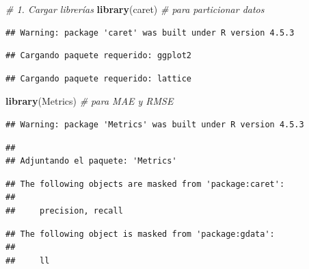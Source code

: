 \documentclass[
]{article}
\newenvironment{Shaded}{\begin{snugshade}}{\end{snugshade}}
\newcommand{\CommentTok}[1]{\textcolor[rgb]{0.56,0.35,0.01}{\textit{#1}}}
\newcommand{\FunctionTok}[1]{\textcolor[rgb]{0.13,0.29,0.53}{\textbf{#1}}}
\newcommand{\NormalTok}[1]{#1}
\begin{document}
\begin{Shaded}
\begin{Highlighting}[]
\CommentTok{\# 1. Cargar librerías}
\FunctionTok{library}\NormalTok{(caret)     }\CommentTok{\# para particionar datos}
\end{Highlighting}
\end{Shaded}

\begin{verbatim}
## Warning: package 'caret' was built under R version 4.5.3
\end{verbatim}

\begin{verbatim}
## Cargando paquete requerido: ggplot2
\end{verbatim}

\begin{verbatim}
## Cargando paquete requerido: lattice
\end{verbatim}

\begin{Shaded}
\begin{Highlighting}[]
\FunctionTok{library}\NormalTok{(Metrics)   }\CommentTok{\# para MAE y RMSE}
\end{Highlighting}
\end{Shaded}

\begin{verbatim}
## Warning: package 'Metrics' was built under R version 4.5.3
\end{verbatim}

\begin{verbatim}
## 
## Adjuntando el paquete: 'Metrics'
\end{verbatim}

\begin{verbatim}
## The following objects are masked from 'package:caret':
## 
##     precision, recall
\end{verbatim}

\begin{verbatim}
## The following object is masked from 'package:gdata':
## 
##     ll
\end{verbatim}
\end{document}
